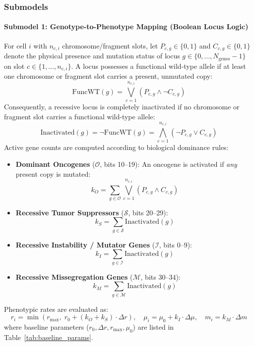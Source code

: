 \documentclass[11pt,a4paper]{article}
\begin{document}
\subsubsection{Submodels}

\paragraph{Submodel 1: Genotype-to-Phenotype Mapping (Boolean Locus Logic)}
For cell $i$ with $n_{c, i}$ chromosome/fragment slots, let $P_{c, g} \in \{0, 1\}$ and $C_{c, g} \in \{0, 1\}$ denote the physical presence and mutation status of locus $g \in \{0, \dots, N_{\text{genes}}-1\}$ on slot $c \in \{1, \dots, n_{c, i}\}$.
A locus possesses a functional wild-type allele if at least one chromosome or fragment slot carries a present, unmutated copy:
\begin{equation}
    \text{FuncWT}(g) = \bigvee_{c=1}^{n_{c, i}} \left( P_{c, g} \land \neg C_{c, g} \right)
\end{equation}
Consequently, a recessive locus is completely inactivated if no chromosome or fragment slot carries a functional wild-type allele:
\begin{equation}
    \text{Inactivated}(g) = \neg \text{FuncWT}(g) = \bigwedge_{c=1}^{n_{c, i}} \left( \neg P_{c, g} \lor C_{c, g} \right)
\end{equation}
Active gene counts are computed according to biological dominance rules:
\begin{itemize}
    \item \textbf{Dominant Oncogenes} ($\mathcal{O}$, bits 10--19): An oncogene is activated if \emph{any} present copy is mutated:
    \begin{equation}
        k_O = \sum_{g \in \mathcal{O}} \bigvee_{c=1}^{n_{c, i}} \left( P_{c, g} \land C_{c, g} \right)
    \end{equation}
    \item \textbf{Recessive Tumor Suppressors} ($\mathcal{S}$, bits 20--29):
    \begin{equation}
        k_S = \sum_{g \in \mathcal{S}} \text{Inactivated}(g)
    \end{equation}
    \item \textbf{Recessive Instability / Mutator Genes} ($\mathcal{I}$, bits 0--9):
    \begin{equation}
        k_I = \sum_{g \in \mathcal{I}} \text{Inactivated}(g)
    \end{equation}
    \item \textbf{Recessive Missegregation Genes} ($\mathcal{M}$, bits 30--34):
    \begin{equation}
        k_M = \sum_{g \in \mathcal{M}} \text{Inactivated}(g)
    \end{equation}
\end{itemize}
Phenotypic rates are evaluated as:
\begin{equation}
    r_i = \min\left(r_{\max}, \; r_0 + (k_O + k_S) \cdot \Delta r\right), \quad \mu_i = \mu_0 + k_I \cdot \Delta\mu, \quad m_i = k_M \cdot \Delta m
\end{equation}
where baseline parameters ($r_0, \Delta r, r_{\max}, \mu_0$) are listed in Table~\ref{tab:baseline_params}.
\end{document}
